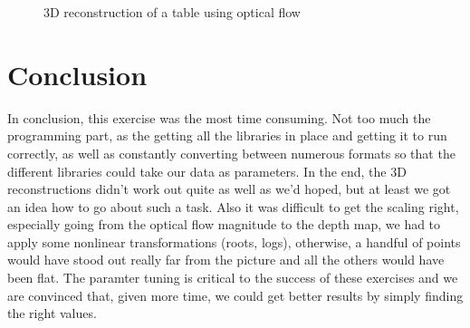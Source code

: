 \documentclass[11pt,a4paper]{article}
\begin{document}
\begin{figure}
\quad
{}
\quad
\caption{3D reconstruction of a table using optical flow}%
\label{fig:e3}%
\end{figure}

\section*{Conclusion}
In conclusion, this exercise was the most time consuming. Not too much the programming part, as the getting all the libraries in place and getting it to run correctly, as well as constantly converting between numerous formats so that the different libraries could take our data as parameters. In the end, the 3D reconstructions didn't work out quite as well as we'd hoped, but at least we got an idea how to go about such a task.
Also it was difficult to get the scaling right, especially going from the optical flow magnitude to the depth map, we had to apply some nonlinear transformations (roots, logs), otherwise, a handful of points would have stood out really far from the picture and all the others would have been flat. The paramter tuning is critical to the success of these exercises and we are convinced that, given more time, we could get better results by simply finding the right values.
\end{document}
